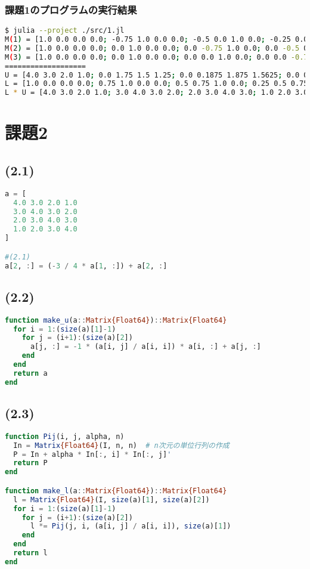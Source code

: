 \documentclass[uplatex, dvipdfmx, a4j,11pt]{jsarticle}
\begin{document}
\subsubsection*{課題1のプログラムの実行結果}
\begin{lstlisting}[title={課題1のプログラムの実行結果}, label=code:in, language=sh]
$ julia --project ./src/1.jl
M(1) = [1.0 0.0 0.0 0.0; -0.75 1.0 0.0 0.0; -0.5 0.0 1.0 0.0; -0.25 0.0 0.0 1.0]
M(2) = [1.0 0.0 0.0 0.0; 0.0 1.0 0.0 0.0; 0.0 -0.75 1.0 0.0; 0.0 -0.5 0.0 1.0]
M(3) = [1.0 0.0 0.0 0.0; 0.0 1.0 0.0 0.0; 0.0 0.0 1.0 0.0; 0.0 0.0 -0.75 1.0]
===================
U = [4.0 3.0 2.0 1.0; 0.0 1.75 1.5 1.25; 0.0 0.1875 1.875 1.5625; 0.0 0.234375 0.34375 1.953125]
L = [1.0 0.0 0.0 0.0; 0.75 1.0 0.0 0.0; 0.5 0.75 1.0 0.0; 0.25 0.5 0.75 1.0]
L * U = [4.0 3.0 2.0 1.0; 3.0 4.0 3.0 2.0; 2.0 3.0 4.0 3.0; 1.0 2.0 3.0 4.0]%
\end{lstlisting}


\section*{課題2}
\subsection*{(2.1)}
\begin{lstlisting}[title={(2.1)}, label=code:in, language=Julia]
a = [
  4.0 3.0 2.0 1.0
  3.0 4.0 3.0 2.0
  2.0 3.0 4.0 3.0
  1.0 2.0 3.0 4.0
]

#(2.1)
a[2, :] = (-3 / 4 * a[1, :]) + a[2, :]
\end{lstlisting}

\subsection*{(2.2)}
\begin{lstlisting}[title={(2.2)}, label=code:in, language=Julia]
function make_u(a::Matrix{Float64})::Matrix{Float64}
  for i = 1:(size(a)[1]-1)
    for j = (i+1):(size(a)[2])
      a[j, :] = -1 * (a[i, j] / a[i, i]) * a[i, :] + a[j, :]
    end
  end
  return a
end
\end{lstlisting}

\newpage
\subsection*{(2.3)}
\begin{lstlisting}[title={(2.3)}, label=code:in, language=Julia]
function Pij(i, j, alpha, n)
  In = Matrix{Float64}(I, n, n)  # n次元の単位行列の作成
  P = In + alpha * In[:, i] * In[:, j]'
  return P
end

function make_l(a::Matrix{Float64})::Matrix{Float64}
  l = Matrix{Float64}(I, size(a)[1], size(a)[2])
  for i = 1:(size(a)[1]-1)
    for j = (i+1):(size(a)[2])
      l *= Pij(j, i, (a[i, j] / a[i, i]), size(a)[1])
    end
  end
  return l
end
\end{lstlisting}
\end{document}
